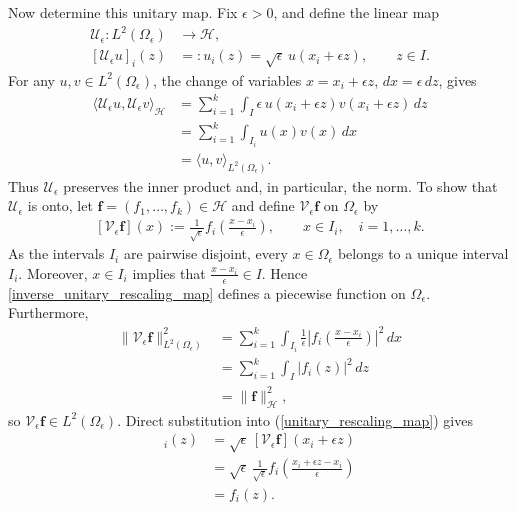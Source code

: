 \documentclass[preprint,12pt]{elsarticle}
\newcommand{\fvect}[1]{\mathbf{#1}}
\begin{document}
Now determine this unitary map. Fix $\epsilon>0$, and define the linear map
\begin{align}\label{unitary_rescaling_map}
    \mathcal U_\epsilon:L^2(\Omega_\epsilon)
    &\longrightarrow\mathcal H,\nonumber\\
    [\mathcal U_\epsilon u]_i(z)
    &=:u_i(z)
      =\sqrt{\epsilon}\,u(x_i+\epsilon z),
      \qquad z\in I.
\end{align}
For any
$u,v\in L^2(\Omega_\epsilon)$, the change of variables
$x=x_i+\epsilon z$, $dx=\epsilon\,dz$, gives
\begin{align*}
    \langle\mathcal U_\epsilon u,\mathcal U_\epsilon v
    \rangle_{\mathcal H}
    &=
    \sum_{i=1}^k
    \int_I
    \epsilon\,
    u(x_i+\epsilon z)
    v(x_i+\epsilon z)\,dz\\
    &=
    \sum_{i=1}^k
    \int_{I_i}u(x)v(x)\,dx\\
    &=
    \langle u,v\rangle_{L^2(\Omega_\epsilon)}.
\end{align*}
Thus $\mathcal U_\epsilon$ preserves the inner product and, in
particular, the norm. To show that $\mathcal U_\epsilon$ is onto, let
$\fvect{f}=(f_1,\ldots,f_k)\in\mathcal H$ and define 
$\mathcal V_\epsilon\fvect{f}$
on $\Omega_\epsilon$
by
\begin{align}\label{inverse_unitary_rescaling_map}
    [\mathcal V_\epsilon\fvect{f}](x)
    :=
    \frac{1}{\sqrt{\epsilon}}
    f_i\left(\frac{x-x_i}{\epsilon}\right),
    \qquad x\in I_i,\quad i=1,\ldots,k.
\end{align}
As the intervals $I_i$ are pairwise disjoint, every
$x\in\Omega_\epsilon$ belongs to a unique interval $I_i$. Moreover,
$x\in I_i$ implies that $\frac{x-x_i}{\epsilon}\in I$.
Hence \eqref{inverse_unitary_rescaling_map} defines a piecewise
function on $\Omega_\epsilon$. Furthermore,
\begin{align*}
    \|\mathcal V_\epsilon\fvect{f}\|_{L^2(\Omega_\epsilon)}^2
    &=
    \sum_{i=1}^k
    \int_{I_i}
    \frac{1}{\epsilon}
    \left|
    f_i\left(\frac{x-x_i}{\epsilon}\right)
    \right|^2\,dx\\
    &=
    \sum_{i=1}^k\int_I|f_i(z)|^2\,dz\\
    &=
    \|\fvect{f}\|_{\mathcal H}^2,
\end{align*}
so $\mathcal V_\epsilon\fvect{f}\in L^2(\Omega_\epsilon)$.
Direct substitution into (\ref{unitary_rescaling_map}) gives
\begin{align*}
    [\mathcal U_\epsilon\mathcal V_\epsilon\fvect{f}]_i(z)
    &=
    \sqrt{\epsilon}\,
    [\mathcal V_\epsilon\fvect{f}](x_i+\epsilon z)\\
    &=
    \sqrt{\epsilon}\,
    \frac{1}{\sqrt{\epsilon}}
    f_i\left(
        \frac{x_i+\epsilon z-x_i}{\epsilon}
    \right)\\
    &=
    f_i(z).
\end{align*}
\end{document}

